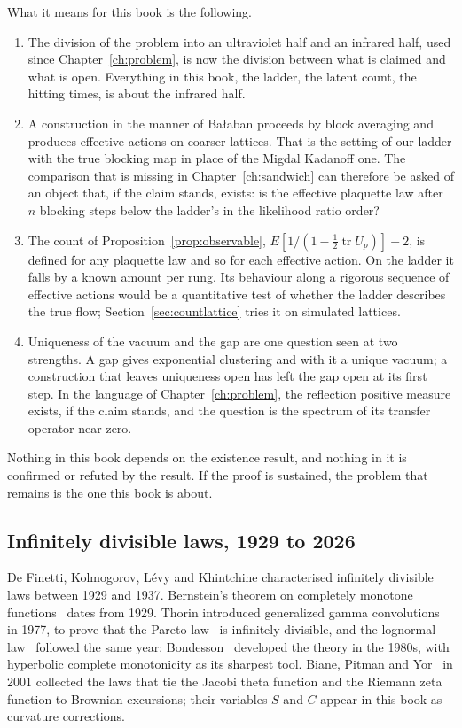 What it means for this book is the following.

\begin{enumerate}
\item The division of the problem into an ultraviolet half and an infrared half, used since Chapter~\ref{ch:problem}, is now the division between what is claimed and what is open. Everything in this book, the ladder, the latent count, the hitting times, is about the infrared half.
\item A construction in the manner of Ba\l aban proceeds by block averaging and produces effective actions on coarser lattices. That is the setting of our ladder with the true blocking map in place of the Migdal Kadanoff one. The comparison that is missing in Chapter~\ref{ch:sandwich} can therefore be asked of an object that, if the claim stands, exists: is the effective plaquette law after $n$ blocking steps below the ladder's in the likelihood ratio order?
\item The count of Proposition~\ref{prop:observable}, $E[1/(1-\frac12\operatorname{tr}U_p)]-2$, is defined for any plaquette law and so for each effective action. On the ladder it falls by a known amount per rung. Its behaviour along a rigorous sequence of effective actions would be a quantitative test of whether the ladder describes the true flow; Section~\ref{sec:countlattice} tries it on simulated lattices.
\item Uniqueness of the vacuum and the gap are one question seen at two strengths. A gap gives exponential clustering and with it a unique vacuum; a construction that leaves uniqueness open has left the gap open at its first step. In the language of Chapter~\ref{ch:problem}, the reflection positive measure exists, if the claim stands, and the question is the spectrum of its transfer operator near zero.
\end{enumerate}

Nothing in this book depends on the existence result, and nothing in it is confirmed or refuted by the result. If the proof is sustained, the problem that remains is the one this book is about.

\subsection{Infinitely divisible laws, 1929 to 2026}

De Finetti, Kolmogorov, L\'evy and Khintchine characterised infinitely divisible laws between 1929 and 1937. Bernstein's theorem on completely monotone functions~\cite{Be29} dates from 1929. Thorin introduced generalized gamma convolutions in 1977, to prove that the Pareto law~\cite{Th77} is infinitely divisible, and the lognormal law~\cite{Th77b} followed the same year; Bondesson~\cite{Bo92} developed the theory in the 1980s, with hyperbolic complete monotonicity as its sharpest tool. Biane, Pitman and Yor~\cite{BPY} in 2001 collected the laws that tie the Jacobi theta function and the Riemann zeta function to Brownian excursions; their variables $S$ and $C$ appear in this book as curvature corrections.

